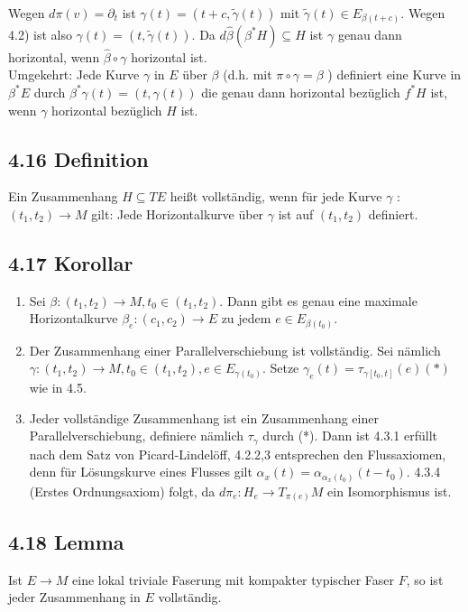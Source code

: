 \documentclass[10pt, letterpaper]{article}
\begin{document}
Wegen $d \pi(v)=\partial_{t}$ ist $\gamma(t)=(t+c, \tilde{\gamma}(t))$ mit $\tilde{\gamma}(t) \in E_{\beta(t+c)}$. Wegen 4.2) ist also $\gamma(t)=(t, \tilde{\gamma}(t))$. Da $d \hat{\beta}\left(\beta^{*} H\right) \subseteq H$ ist $\gamma$ genau dann horizontal, wenn $\hat{\beta} \circ \gamma$ horizontal ist.\\
Umgekehrt: Jede Kurve $\gamma$ in $E$ über $\beta$ (d.h. mit $\pi \circ \gamma=\beta$ ) definiert eine Kurve in $\beta^{*} E$ durch $\beta^{*} \gamma(t)=(t, \gamma(t))$ die genau dann horizontal bezüglich $f^{*} H$ ist, wenn $\gamma$ horizontal bezüglich $H$ ist.

\subsection*{4.16 Definition}
Ein Zusammenhang $H \subseteq T E$ heißt vollständig, wenn für jede Kurve $\gamma$ : $\left(t_{1}, t_{2}\right) \rightarrow M$ gilt: Jede Horizontalkurve über $\gamma$ ist auf $\left(t_{1}, t_{2}\right)$ definiert.

\subsection*{4.17 Korollar}
\begin{enumerate}
  \item Sei $\beta:\left(t_{1}, t_{2}\right) \rightarrow M, t_{0} \in\left(t_{1}, t_{2}\right)$. Dann gibt es genau eine maximale Horizontalkurve $\beta_{e}:\left(c_{1}, c_{2}\right) \rightarrow E$ zu jedem $e \in E_{\beta\left(t_{0}\right)}$.
  \item Der Zusammenhang einer Parallelverschiebung ist vollständig. Sei nämlich $\gamma:\left(t_{1}, t_{2}\right) \rightarrow M, t_{0} \in\left(t_{1}, t_{2}\right), e \in E_{\gamma\left(t_{0}\right)}$. Setze $\gamma_{e}(t)=\tau_{\gamma\left[t_{0}, t\right]}(e)(*)$ wie in 4.5.
  \item Jeder vollständige Zusammenhang ist ein Zusammenhang einer Parallelverschiebung, definiere nämlich $\tau_{\gamma}$ durch (*). Dann ist 4.3.1 erfüllt nach dem Satz von Picard-Lindelöff, 4.2.2,3 entsprechen den Flussaxiomen, denn für Lösungskurve eines Flusses gilt $\alpha_{x}(t)=\alpha_{\alpha_{x}\left(t_{0}\right)}\left(t-t_{0}\right)$. 4.3.4 (Erstes Ordnungsaxiom) folgt, da $d \pi_{e}: H_{e} \rightarrow T_{\pi(e)} M$ ein Isomorphismus ist.
\end{enumerate}

\subsection*{4.18 Lemma}
Ist $E \rightarrow M$ eine lokal triviale Faserung mit kompakter typischer Faser $F$, so ist jeder Zusammenhang in $E$ vollständig.
\end{document}
